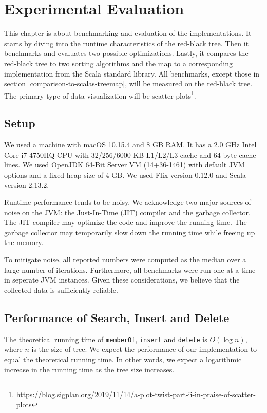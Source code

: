 \documentclass[../main.tex]{subfiles}
\begin{document}
\chapter{Experimental Evaluation} \label{experimental-evaluation}

This chapter is about benchmarking and evaluation of the implementations. It starts by diving into the runtime characteristics of the red-black tree. Then it benchmarks and evaluates two possible optimizations. Lastly, it compares the red-black tree to two sorting algorithms and the map to a corresponding implementation from the Scala standard library. All benchmarks, except those in section \ref{comparison-to-scalas-treemap}, will be measured on the red-black tree. The primary type of data visualization will be scatter plots\footnote{https://blog.sigplan.org/2019/11/14/a-plot-twist-part-ii-in-praise-of-scatter-plots}.

\section{Setup}
We used a machine with macOS 10.15.4 and 8 GB RAM. It has a 2.0 GHz Intel Core i7-4750HQ CPU with 32/256/6000 KB L1/L2/L3 cache and 64-byte cache lines. We used OpenJDK 64-Bit Server VM (14+36-1461) with default JVM options and a fixed heap size of 4 GB. We used Flix version 0.12.0 and Scala version 2.13.2.

Runtime performance tends to be noisy. We acknowledge two major sources of noise on the JVM: the Just-In-Time (JIT) compiler and the garbage collector. The JIT compiler may optimize the code and improve the running time. The garbage collector may temporarily slow down the running time while freeing up the memory.

To mitigate noise, all reported numbers were computed as the median over a large number of iterations. Furthermore, all benchmarks were run one at a time in seperate JVM instances. Given these considerations, we believe that the collected data is sufficiently reliable.

\section{Performance of Search, Insert and Delete} \label{performance-of-seach-insert-and-delete}

The theoretical running time of \lstinline{memberOf}, \lstinline{insert} and \lstinline{delete} is $O(\log{n})$, where $n$ is the size of tree. We expect the performance of our implementation to equal the theoretical running time. In other words, we expect a logarithmic increase in the running time as the tree size increases.
\end{document}
